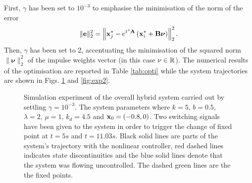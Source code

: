 First, $\gamma$ has been set to $10^{-3}$ to emphasise the minimisation of the norm of the error 
%
\begin{equation}
    \|\mathbf{e}\|_2^2=\left\|\mathbf{x}_j^* - e^{t^*\mathbf{A}}\left(\mathbf{x}_i^*+\mathbf{B}\bm\nu\right)\right\|^2_2.
\end{equation}
%
Then, $\gamma$ has been set to 2, accentuating the minimisation of the squared norm $\|\bm\nu\|_2^2$ of the impulse weights vector (in this case $\nu\in\mathbb{R}$). The numerical results of the optimisation are reported in Table \ref{tab:opti} while the system trajectories are shown in Figs. \ref{fig:exp1} and \ref{fig:exp2}. 
%
\begin{table}[!ht]
    \caption{Hybrid controller optimisation results.}
	\centering
	\label{tab:opti}
\end{table}	
%
\begin{figure}[!ht]
    \centering
    \caption[Simulation experiment of the overall hybrid system with $\gamma = 10^{-3}$.]{Simulation experiment of the overall hybrid system carried out by settling $\gamma = 10^{-3}$. The system parameters where $k = 5$, $b = 0.5$, $\lambda = 2$, $\mu = 1$, $k_d = 4.5$ and $\mathbf{x}_0 = (-0.8,0)$. 
    Two switching signals have been given to the system in order to trigger the change of fixed point at $t = 5s$ and $t = 11.03s$. Black solid lines are parts of the system's trajectory with the nonlinear controller, red dashed lines indicates state discontinuities and the blue solid lines denote that the system was flowing uncontrolled. The dashed green lines are the the fixed points.
    }
    \label{fig:exp1}
\end{figure}
